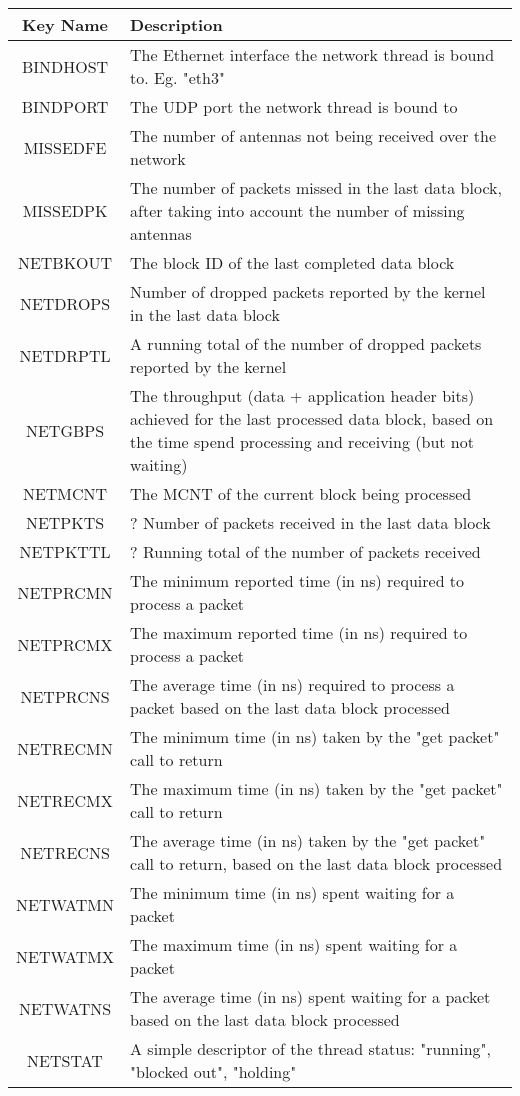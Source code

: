 \documentclass{article}
\begin{document}
\begin{centering}
\begin{tabular}{c p{}}
\hline
Key Name & Description \\
\hline
\hline
BINDHOST & The Ethernet interface the network thread is bound to. Eg. "eth3" \\
BINDPORT & The UDP port the network thread is bound to \\
MISSEDFE & The number of antennas not being received over the network \\
MISSEDPK & The number of packets missed in the last data block, after taking into account the number of missing antennas \\
NETBKOUT & The block ID of the last completed data block \\
NETDROPS & Number of dropped packets reported by the kernel in the last data block \\
NETDRPTL & A running total of the number of dropped packets reported by the kernel \\
NETGBPS  & The throughput (data + application header bits) achieved for the last processed data block, based on the time spend processing and receiving (but not waiting) \\
NETMCNT  & The MCNT of the current block being processed \\
NETPKTS  & ? Number of packets received in the last data block\\
NETPKTTL & ? Running total of the number of packets received \\
NETPRCMN & The minimum reported time (in ns) required to process a packet \\
NETPRCMX & The maximum reported time (in ns) required to process a packet \\
NETPRCNS & The average time (in ns) required to process a packet based on the last data block processed \\
NETRECMN & The minimum time (in ns) taken by the "get packet" call to return \\
NETRECMX & The maximum time (in ns) taken by the "get packet" call to return \\
NETRECNS & The average time (in ns) taken by the "get packet" call to return, based on the last data block processed \\
NETWATMN & The minimum time (in ns) spent waiting for a packet \\
NETWATMX & The maximum time (in ns) spent waiting for a packet \\
NETWATNS & The average time (in ns) spent waiting for a packet based on the last data block processed \\
NETSTAT  & A simple descriptor of the thread status: "running", "blocked out", "holding" \\
\end{tabular}
\end{centering}
\end{document}
